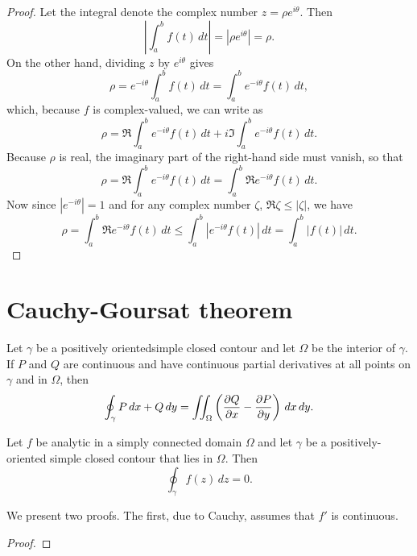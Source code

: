 \begin{proof}
    Let the integral denote the complex number \(z = \rho e^{i\theta}\). Then
    \[
        \left| \int_a^b f(t) \, dt \right| = \left| \rho e^{i\theta} \right| = \rho.
    \]
    On the other hand, dividing \(z\) by \(e^{i\theta}\) gives
    \[
        \rho = e^{-i\theta} \int_a^b f(t) \, dt = \int_a^b e^{-i\theta} f(t) \, dt,
    \]
    which, because \(f\) is complex-valued, we can write as
    \[
        \rho = \Re \int_a^b e^{-i\theta} f(t) \, dt + i \Im \int_a^b e^{-i\theta} f(t) \, dt.
    \]
    Because \(\rho\) is real, the imaginary part of the right-hand side must
    vanish, so that
    \[
        \rho = \Re \int_a^b e^{-i\theta} f(t) \, dt = \int_a^b \Re e^{-i\theta} f(t) \, dt.
    \]
    Now since \(|e^{-i\theta}| = 1\) and for any complex number \(\zeta\), \(\Re \zeta \leq |\zeta|\), we have
    \[
        \rho = \int_a^b \Re e^{-i\theta} f(t) \, dt \leq \int_a^b |e^{-i\theta} f(t)| \, dt = \int_a^b |f(t)| \, dt.
    \]
\end{proof}


\section{Cauchy-Goursat theorem}

\begin{theorem}
    Let \(\gamma\) be a positively orientedsimple closed contour and let \(\Omega\) be the interior of \(\gamma\). If \(P\) and \(Q\) are continuous and have continuous partial derivatives at all points on \(\gamma\) and in \(\Omega\), then
    \[
        \oint_\gamma P \, dx + Q \, dy = \iint_\Omega \left( \frac{\partial Q}{\partial x} - \frac{\partial P}{\partial y} \right) \, dx \, dy.
    \]
\end{theorem}

\begin{theorem}
    Let \(f\) be analytic in a simply connected domain \(\Omega\) and let \(\gamma\) be a positively-oriented simple closed contour that lies in \(\Omega\). Then
    \[
        \oint_\gamma f(z) \, dz = 0.
    \]
    \label{thm:cauchy-goursat}
\end{theorem}


We present two proofs. The first, due to Cauchy, assumes that \(f'\) is
continuous.

\begin{proof}

\end{proof}

